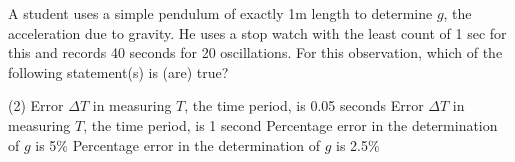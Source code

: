
\item A student uses a simple pendulum of exactly 1m length to determine \( g \), the acceleration due to gravity. He uses a stop watch with the least count of 1 sec for this and records 40 seconds for 20 oscillations. For this observation, which of the following statement(s) is (are) true?
    \begin{tasks}(2)
        \task Error \( \Delta T \) in measuring \( T \), the time period, is 0.05 seconds
        \task Error \( \Delta T \) in measuring \( T \), the time period, is 1 second
        \task Percentage error in the determination of \( g \) is 5\%
        \task Percentage error in the determination of \( g \) is 2.5\%
    \end{tasks}
